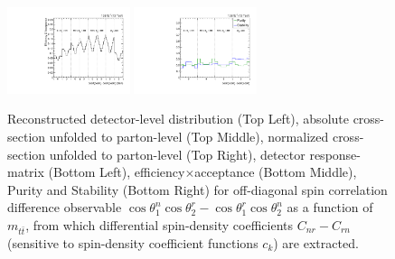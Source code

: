 \begin{figure}[htb]
\begin{center}
 \includegraphics[width=0.32\textwidth]{fig_fullRun2UL/unfolding/combined/TotEff_c_Mnr_mttbar.pdf}
 \includegraphics[width=0.32\textwidth]{fig_fullRun2UL/unfolding/combined/PurStab_c_Mnr_mttbar.pdf} \\
\caption{Reconstructed detector-level distribution (Top Left), absolute cross-section unfolded to parton-level (Top Middle), normalized cross-section unfolded to parton-level (Top Right), detector response-matrix (Bottom Left), efficiency$\times$acceptance (Bottom Middle), Purity and Stability (Bottom Right) for off-diagonal spin correlation difference observable $\cos\theta_{1}^{n}\cos\theta_{2}^{r}-\cos\theta_{1}^{r}\cos\theta_{2}^{n}$ as a function of $m_{t\bar{t}}$, from which differential spin-density coefficients $C_{nr}-C_{rn}$ (sensitive to spin-density coefficient functions $c_k$) are extracted.}
\label{fig:c_Mnr_mttbar}
\end{center}
\end{figure}
\clearpage

